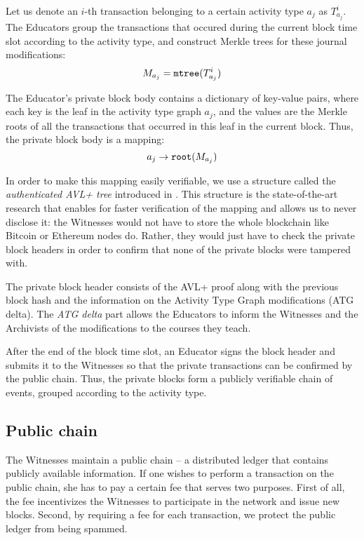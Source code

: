 Let us denote an $i$-th transaction belonging to a certain activity type $a_j$ as $T_{a_j}^i$. The Educators group the transactions that occured during the current block time slot according to the activity type, and construct Merkle trees \cite{merkle1989certified} for these journal modifications:
\begin{equation}
M_{a_j} = \mathtt{mtree}(T_{a_j}^i)
\end{equation}

The Educator's private block body contains a dictionary of key-value pairs, where each key is the leaf in the activity type graph $a_j$, and the values are the Merkle roots of all the transactions that occurred in this leaf in the current block. Thus, the private block body is a mapping:
\begin{equation}
a_j \rightarrow \mathtt{root}(M_{a_j})
\end{equation}

In order to make this mapping easily verifiable, we use a structure called the \textit{authenticated AVL+ tree} introduced in \cite{reyzin2016improving}. This structure is the state-of-the-art research that enables for faster verification of the mapping and allows us to never disclose it: the Witnesses would not have to store the whole blockchain like Bitcoin or Ethereum nodes do. Rather, they would just have to check the private block headers in order to confirm that none of the private blocks were tampered with.

The private block header consists of the AVL+ proof along with the previous block hash and the information on the Activity Type Graph modifications (ATG delta). The \textit{ATG delta} part allows the Educators to inform the Witnesses and the Archivists of the modifications to the courses they teach.

After the end of the block time slot, an Educator signs the block header and submits it to the Witnesses so that the private transactions can be confirmed by the public chain. Thus, the private blocks form a publicly verifiable chain of events, grouped according to the activity type.

\subsection{Public chain}
The Witnesses maintain a public chain -- a distributed ledger that contains publicly available information. If one wishes to perform a transaction on the public chain, she has to pay a certain fee that serves two purposes. First of all, the fee incentivizes the Witnesses to participate in the network and issue new blocks. Second, by requiring a fee for each transaction, we protect the public ledger from being spammed.

